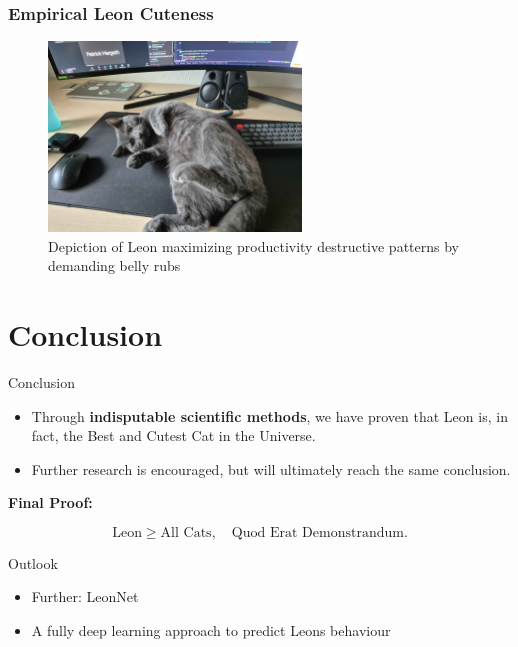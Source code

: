 \documentclass[compress]{beamer}
\begin{document}
\begin{frame}
\frametitle{Empirical Leon Cuteness}
\begin{center}
  \begin{figure}[h]
    \includegraphics[width=0.6\textwidth]{images/keyboard_leon.jpg} %
\caption{Depiction of Leon maximizing productivity destructive patterns by demanding belly rubs}
\label{fig:egypt_cat} %
  \end{figure}  

\end{center}
\end{frame}


\section{Conclusion}
\begin{frame}{Conclusion}
    \begin{itemize}
        \item Through \textbf{indisputable scientific methods}, we have proven that Leon is, in fact, the Best and Cutest Cat in the Universe.
        \item Further research is encouraged, but will ultimately reach the same conclusion.
    \end{itemize}

    \textbf{Final Proof:}

    \begin{equation}
        \text{Leon} \geq \text{All Cats}, \quad \text{Quod Erat Demonstrandum.}
    \end{equation}
\end{frame}

\begin{frame}{Outlook}
    \begin{itemize}
      \item Further: LeonNet
      \item A fully deep learning approach to predict Leons behaviour
    \end{itemize}

    \end{frame}
\end{document}
